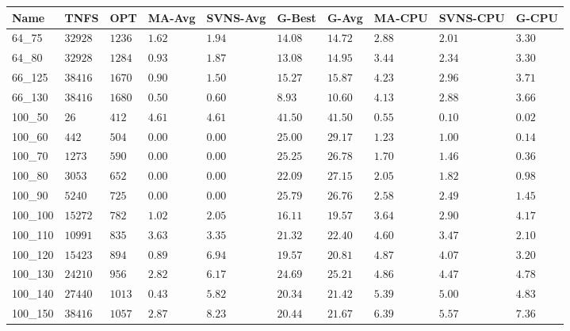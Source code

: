 \begin{center}
\begin{table}[]
\centering
\begin{tabular}{|lll|l|l|ll|lll|}
\hline
Name     & TNFS        & OPT    & MA-Avg & SVNS-Avg & G-Best & G-Avg & MA-CPU & SVNS-CPU & G-CPU \\
\hline
64\_75   & $32928   $  & $1236$ & $1.62$ & $1.94$   & $14.08$    & $14.72$   & $2.88 $& $2.01$   & $3.30$ \\
64\_80   & $32928   $  & $1284$ & $0.93$ & $1.87$   & $13.08$    & $14.95$   & $3.44 $& $2.34$   & $3.30$ \\
\hline
66\_125  & $38416   $  & $1670$ & $0.90$ & $1.50$   & $15.27$    & $15.87$   & $4.23 $& $2.96$   & $3.71$ \\
66\_130  & $38416   $  & $1680$ & $0.50$ & $0.60$   & $8.93$    & $10.60$   & $4.13 $& $2.88$   & $3.66$ \\
\hline
100\_50  & $26      $  & $412 $ & $4.61$ & $4.61$   & $41.50$    & $41.50$   & $0.55 $& $0.10$   & $0.02$ \\
100\_60  & $442     $  & $504 $ & $\bm{0.00}$ & $\bm{0.00}$   & $25.00$    & $29.17$   & $1.23 $& $1.00$   & $0.14$ \\
100\_70  & $1273    $  & $590 $ & $\bm{0.00}$ & $\bm{0.00}$   & $25.25$    & $26.78$   & $1.70 $& $1.46$   & $0.36$ \\
100\_80  & $3053    $  & $652 $ & $\bm{0.00}$ & $\bm{0.00}$   & $22.09$    & $27.15$   & $2.05 $& $1.82$   & $0.98$ \\
100\_90  & $5240    $  & $725 $ & $\bm{0.00}$ & $\bm{0.00}$   & $25.79$    & $26.76$   & $2.58 $& $2.49$   & $1.45$ \\
100\_100 & $15272   $  & $782 $ & $1.02$ & $2.05$   & $16.11$    & $19.57$   & $3.64 $& $2.90$   & $4.17$ \\
100\_110 & $10991   $  & $835 $ & $3.63$ & $3.35$   & $21.32$    & $22.40$   & $4.60 $& $3.47$   & $2.10$ \\
100\_120 & $15423   $  & $894 $ & $0.89$ & $6.94$   & $19.57$    & $20.81$   & $4.87 $& $4.07$   & $3.20$ \\
100\_130 & $24210   $  & $956 $ & $2.82$ & $6.17$   & $24.69$    & $25.21$   & $4.86 $& $4.47$   & $4.78$ \\
100\_140 & $27440   $  & $1013$ & $0.43$ & $5.82$   & $20.34$    & $21.42$   & $5.39 $& $5.00$   & $4.83$ \\
100\_150 & $38416   $  & $1057$ & $2.87$ & $8.23$   & $20.44$    & $21.67$   & $6.39 $& $5.57$   & $7.36$ \\

\end{tabular}
\end{table}
\end{center}
